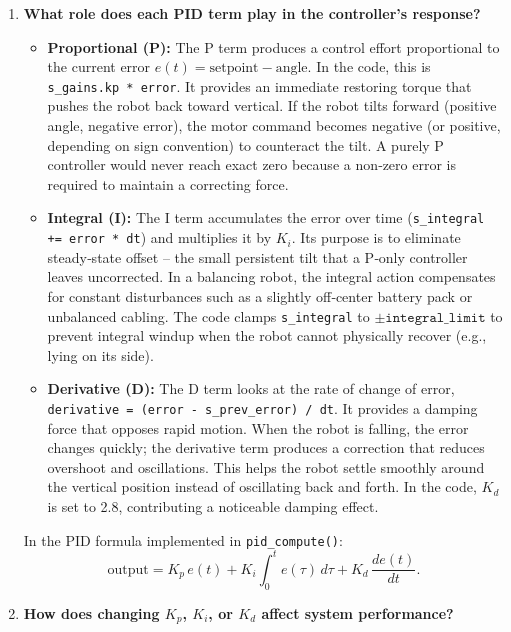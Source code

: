 \documentclass[12pt,a4paper]{article}
\begin{document}
	\begin{enumerate}[leftmargin=*, label=\textbf{Q\arabic*}]
		
		\item \textbf{What role does each PID term play in the controller's response?}
		
		\begin{itemize}
			\item \textbf{Proportional (P):} The P term produces a control effort 
			proportional to the current error $e(t) = \text{setpoint} - \text{angle}$. 
			In the code, this is \texttt{s\_gains.kp * error}. It provides an immediate 
			restoring torque that pushes the robot back toward vertical. If the robot 
			tilts forward (positive angle, negative error), the motor command becomes 
			negative (or positive, depending on sign convention) to counteract the tilt. 
			A purely P controller would never reach exact zero because a non‑zero error 
			is required to maintain a correcting force.
			
			\item \textbf{Integral (I):} The I term accumulates the error over time 
			(\texttt{s\_integral += error * dt}) and multiplies it by $K_i$. Its purpose 
			is to eliminate steady‑state offset – the small persistent tilt that a P‑only 
			controller leaves uncorrected. In a balancing robot, the integral action 
			compensates for constant disturbances such as a slightly off‑center battery 
			pack or unbalanced cabling. The code clamps \texttt{s\_integral} to 
			$\pm\texttt{integral\_limit}$ to prevent integral windup when the robot 
			cannot physically recover (e.g., lying on its side).
			
			\item \textbf{Derivative (D):} The D term looks at the rate of change of 
			error, \texttt{derivative = (error - s\_prev\_error) / dt}. It provides a 
			damping force that opposes rapid motion. When the robot is falling, the 
			error changes quickly; the derivative term produces a correction that 
			reduces overshoot and oscillations. This helps the robot settle smoothly 
			around the vertical position instead of oscillating back and forth. In the 
			code, $K_d$ is set to 2.8, contributing a noticeable damping effect.
		\end{itemize}
		
		In the PID formula implemented in \texttt{pid\_compute()}:
		\[
		\text{output} = K_p\,e(t) + K_i\int_0^t e(\tau)\,d\tau + K_d\,\frac{de(t)}{dt}.
		\]
		
		\item \textbf{How does changing $K_p$, $K_i$, or $K_d$ affect system performance?}
		

\end{enumerate}
\end{document}

